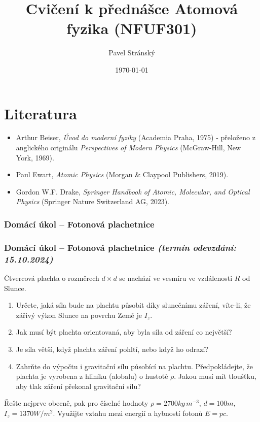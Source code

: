 \documentclass[a4paper,11pt,twoside]{article}
\newenvironment{homework}{}{}
\newcommand{\np}{\clearpage\newpage}
\newcommand{\exercise}[2][]{\ifthenelse{\isempty{#1}}
	{\np\thispagestyle{empty}\subsubsection*{Domácí úkol -- #2}}
	{\np\thispagestyle{empty}\np\subsubsection*{Domácí úkol -- #2 \small{\it{(termín odevzdání: {#1})}}}}
}
\begin{document}
\makeatletter
{}
\renewcommand{\theequation}{\arabic{section}.\arabic{subsection}.\arabic{equation}}
\makeatother

\title{Cvičení k přednášce Atomová fyzika (NFUF301)}
\date{\today}
\author{Pavel Stránský}

\maketitle
{}
\tableofcontents\np

\section*{Literatura}
\begin{itemize}
	\item Arthur Beiser, {\it Úvod do moderní fyziky} (Academia Praha, 1975) - přeloženo z anglického originálu {\it Perspectives of Modern Physics} (McGraw-Hill, New York, 1969).
	
	\item Paul Ewart, {\it Atomic Physics} (Morgan \& Claypool Publishers, 2019).
	
	\item Gordon W.F. Drake, {\it Springer Handbook of Atomic, Molecular, and Optical Physics} (Springer Nature Switzerland AG, 2023).
\end{itemize}

\np
\np
\np
\np
\np
\np
\np
\np
\np
\np

\begin{homework}
\exercise[15.10.2024]{Fotonová plachetnice}
    Čtvercová plachta o rozměrech $d\times d$ se nachází ve vesmíru ve vzdálenosti $R$ od Slunce.
	\begin{enumerate}
		\item Určete, jaká síla bude na plachtu působit díky slunečnímu záření, víte-li, že zářivý výkon Slunce na povrchu Země je $I_{z}$.
		\item Jak musí být plachta orientovaná, aby byla síla od záření co největší?
		\item Je síla větší, když plachta záření pohltí, nebo když ho odrazí?
		\item Zahrňte do výpočtu i gravitační sílu působící na plachtu. 
			Předpokládejte, že plachta je vyrobena z hliníku (alobalu) o hustotě $\rho$.
			Jakou musí mít tloušťku, aby tlak záření překonal gravitační sílu?
	\end{enumerate}
	Řešte nejprve obecně, pak pro číselné hodnoty $\rho=2700\unit{kg\,m^{-3}}$, $d=100\unit{m}$, $I_z=1370\unit{W/m^{2}}$.
	Využijte vztahu mezi energií a hybností fotonů $E=pc$.    
\end{homework}
\end{document}
